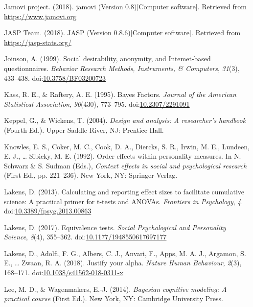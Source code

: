 \documentclass[english,man]{apa6}
\theoremstyle{definition}
\theoremstyle{definition}
\theoremstyle{definition}
\theoremstyle{remark}
\begin{document}
\hypertarget{ref-jamovi2018}{}
Jamovi project. (2018). jamovi (Version 0.8){[}Computer software{]}.
Retrieved from \url{https://www.jamovi.org}

\hypertarget{ref-JASP2018}{}
JASP Team. (2018). JASP (Version 0.8.6){[}Computer software{]}.
Retrieved from \url{https://jasp-stats.org/}

\hypertarget{ref-Joinson1999}{}
Joinson, A. (1999). Social desirability, anonymity, and Intemet-based
questionnaires. \emph{Behavior Research Methods, Instruments, \&
Computers}, \emph{31}(3), 433--438.
doi:\href{https://doi.org/10.3758/BF03200723}{10.3758/BF03200723}

\hypertarget{ref-Kass1995a}{}
Kass, R. E., \& Raftery, A. E. (1995). Bayes Factors. \emph{Journal of
the American Statistical Association}, \emph{90}(430), 773--795.
doi:\href{https://doi.org/10.2307/2291091}{10.2307/2291091}

\hypertarget{ref-Keppel2004}{}
Keppel, G., \& Wickens, T. (2004). \emph{Design and analysis: A
researcher's handbook} (Fourth Ed.). Upper Saddle River, NJ: Prentice
Hall.

\hypertarget{ref-Knowles1992}{}
Knowles, E. S., Coker, M. C., Cook, D. A., Diercks, S. R., Irwin, M. E.,
Lundeen, E. J., \ldots{} Sibicky, M. E. (1992). Order effects within
personality measures. In N. Schwarz \& S. Sudman (Eds.), \emph{Context
effects in social and psychological research} (First Ed., pp. 221--236).
New York, NY: Springer-Verlag.

\hypertarget{ref-Lakens2013}{}
Lakens, D. (2013). Calculating and reporting effect sizes to facilitate
cumulative science: A practical primer for t-tests and ANOVAs.
\emph{Frontiers in Psychology}, \emph{4}.
doi:\href{https://doi.org/10.3389/fpsyg.2013.00863}{10.3389/fpsyg.2013.00863}

\hypertarget{ref-Lakens2017a}{}
Lakens, D. (2017). Equivalence tests. \emph{Social Psychological and
Personality Science}, \emph{8}(4), 355--362.
doi:\href{https://doi.org/10.1177/1948550617697177}{10.1177/1948550617697177}

\hypertarget{ref-Lakens2017}{}
Lakens, D., Adolfi, F. G., Albers, C. J., Anvari, F., Apps, M. A. J.,
Argamon, S. E., \ldots{} Zwaan, R. A. (2018). Justify your alpha.
\emph{Nature Human Behaviour}, \emph{2}(3), 168--171.
doi:\href{https://doi.org/10.1038/s41562-018-0311-x}{10.1038/s41562-018-0311-x}

\hypertarget{ref-Lee2014}{}
Lee, M. D., \& Wagenmakers, E.-J. (2014). \emph{Bayesian cognitive
modeling: A practical course} (First Ed.). New York, NY: Cambridge
University Press.
\end{document}
